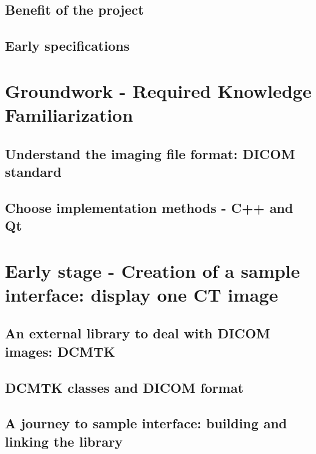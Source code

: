 \documentclass[12pt,twoside]{article}
\begin{document}
\clearpage
\subsection{Benefit of the project}


\clearpage
\subsection{Early specifications}



\clearpage
\section{Groundwork - Required Knowledge Familiarization}
\subsection{Understand the imaging file format: DICOM standard}



\clearpage
\subsection{Choose implementation methods - C++ and Qt}



\clearpage
\section{Early stage - Creation of a sample interface: display one CT image}
\subsection{An external library to deal with DICOM images: DCMTK}


\clearpage
\subsection{DCMTK classes and DICOM format}


\clearpage
\subsection{A journey to sample interface: building and linking the library}

\end{document}
